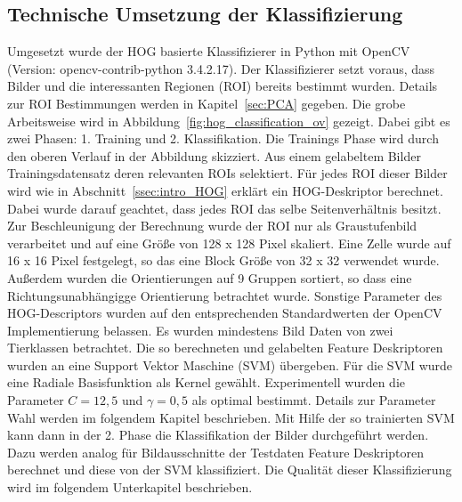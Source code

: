 \subsection{Technische Umsetzung der Klassifizierung}
Umgesetzt wurde der HOG basierte Klassifizierer in Python mit OpenCV (Version: opencv-contrib-python 3.4.2.17). Der Klassifizierer setzt voraus, dass Bilder und die interessanten Regionen (ROI) bereits bestimmt wurden. Details zur ROI Bestimmungen werden in Kapitel~\ref{sec:PCA} gegeben. Die grobe Arbeitsweise wird in Abbildung~\ref{fig:hog_classification_ov} gezeigt. Dabei gibt es zwei Phasen: 1. Training und 2. Klassifikation. Die Trainings Phase wird durch den oberen Verlauf in der Abbildung skizziert. Aus einem gelabeltem Bilder Trainingsdatensatz deren relevanten ROIs selektiert.  Für jedes ROI dieser Bilder wird wie in Abschnitt~\ref{ssec:intro_HOG} erklärt ein HOG-Deskriptor berechnet. Dabei wurde darauf geachtet, dass jedes ROI das selbe Seitenverhältnis besitzt. Zur Beschleunigung der Berechnung wurde der ROI nur als Graustufenbild verarbeitet und auf eine Größe von 128 x 128 Pixel skaliert. Eine Zelle wurde auf 16 x 16 Pixel festgelegt, so das eine Block Größe von 32 x 32 verwendet wurde. Außerdem wurden die Orientierungen auf 9 Gruppen sortiert, so dass eine Richtungsunabhängigge Orientierung betrachtet wurde. Sonstige Parameter des HOG-Descriptors wurden auf den entsprechenden Standardwerten der OpenCV Implementierung belassen. Es wurden mindestens Bild Daten von zwei Tierklassen betrachtet. Die so berechneten und gelabelten Feature Deskriptoren wurden an eine Support Vektor Maschine (SVM) übergeben. Für die SVM wurde eine Radiale Basisfunktion als Kernel gewählt. Experimentell wurden die Parameter $C = 12,5$ und $\gamma = 0,5$ als optimal bestimmt. Details zur Parameter Wahl werden im folgendem Kapitel beschrieben.
Mit Hilfe der so trainierten SVM kann dann in der 2. Phase die Klassifikation der Bilder durchgeführt werden. Dazu werden analog für Bildausschnitte der Testdaten Feature Deskriptoren berechnet und diese von der SVM klassifiziert. Die Qualität dieser Klassifizierung wird im folgendem Unterkapitel beschrieben.
